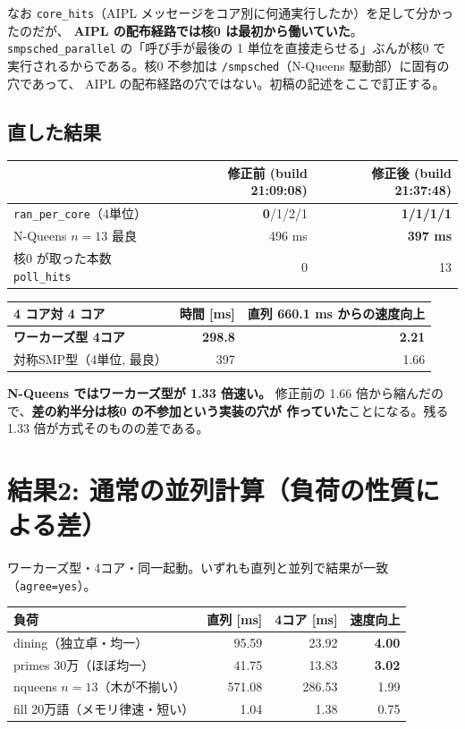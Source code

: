 \documentclass[a4paper,11pt]{ltjsarticle}
\begin{document}
\noindent
なお \texttt{core\_hits}（AIPL メッセージをコア別に何通実行したか）を足して分かったのだが、
\textbf{AIPL の配布経路では核0 は最初から働いていた}。
\texttt{smpsched\_parallel} の「呼び手が最後の 1 単位を直接走らせる」ぶんが核0 で
実行されるからである。核0 不参加は \texttt{/smpsched}（N-Queens 駆動部）に固有の穴であって、
AIPL の配布経路の穴ではない。初稿の記述をここで訂正する。

\subsection{直した結果}

\begin{center}
\begin{tabular}{lrr}
\toprule
 & 修正前 (build 21:09:08) & \textbf{修正後 (build 21:37:48)} \\
\midrule
\texttt{ran\_per\_core}（4単位） & \textbf{0}/1/2/1 & \textbf{1/1/1/1} \\
N-Queens $n=13$ 最良 & 496 ms & \textbf{397 ms} \\
核0 が取った本数 \texttt{poll\_hits} & 0 & 13 \\
\bottomrule
\end{tabular}
\end{center}

\begin{center}
\begin{tabular}{lrr}
\toprule
\textbf{4 コア対 4 コア} & 時間 [ms] & 直列 660.1 ms からの速度向上 \\
\midrule
\textbf{ワーカーズ型 4コア} & \textbf{298.8} & \textbf{2.21} \\
対称SMP型（4単位, 最良） & 397 & 1.66 \\
\bottomrule
\end{tabular}
\end{center}

\noindent
\textbf{N-Queens ではワーカーズ型が 1.33 倍速い。}
修正前の 1.66 倍から縮んだので、\textbf{差の約半分は核0 の不参加という実装の穴が
作っていた}ことになる。残る 1.33 倍が方式そのものの差である。

\section{結果2: 通常の並列計算（負荷の性質による差）}

ワーカーズ型・4コア・同一起動。いずれも直列と並列で結果が一致（\texttt{agree=yes}）。

\begin{center}
\begin{tabular}{lrrr}
\toprule
負荷 & 直列 [ms] & 4コア [ms] & 速度向上 \\
\midrule
dining（独立卓・均一） & 95.59 & 23.92 & \textbf{4.00} \\
primes 30万（ほぼ均一） & 41.75 & 13.83 & \textbf{3.02} \\
nqueens $n{=}13$（木が不揃い） & 571.08 & 286.53 & 1.99 \\
fill 20万語（メモリ律速・短い） & 1.04 & 1.38 & 0.75 \\
\bottomrule
\end{tabular}
\end{center}
\end{document}
